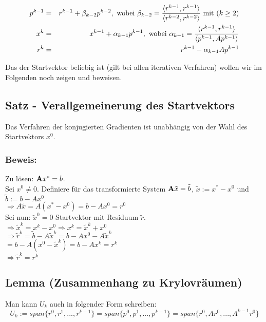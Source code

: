 \begin{eqnarray}
p^{k-1} &=& r^{k-1} + \beta_{k-2}p^{k-2}, \textnormal{ wobei } \beta_{k-2} = \frac {\langle r^{k-1}, r^{k-1} \rangle} {\langle r^{k-2}, r^{k-2} \rangle} \textnormal{ mit } (k \ge 2) \notag \\
x^{k} &=& x^{k-1} + \alpha_{k-1}p^{k-1}, \textnormal{ wobei } \alpha_{k-1} = \frac {\langle r^{k-1}, r^{k-1} \rangle} {\langle p^{k-1}, Ap^{k-1} \rangle} \notag \\
r^{k} &=& r^{k-1} - \alpha_{k-1}Ap^{k-1} \notag
\end{eqnarray}

Das der Startvektor beliebig ist (gilt bei allen iterativen Verfahren) wollen wir im Folgenden noch zeigen und beweisen.

\subsection{Satz - Verallgemeinerung des Startvektors}

Das Verfahren der konjugierten Gradienten ist unabhängig von der Wahl des Startvektors $x^{0}$.

\subsubsection{Beweis:}
Zu lösen: ${\textbf{A}}x^{*} = b$.
\\Sei $x^{0} \ne 0$. Definiere für das transformierte System ${\textbf{A}}\tilde x = \tilde b$, $\tilde x := x^{*} - x^{0}$ und $\tilde b := b - Ax^{0}$
\\$\Longrightarrow A\tilde x = A(x^{*} - x^{0}) = b - Ax^{0} = r^{0}$
\\Sei nun: $\tilde x^{0} = 0$ Startvektor mit Residuum $\tilde r$.
\\$\Longrightarrow \tilde x^{k} = x^{k} - x^{0} \Longrightarrow x^{k} = \tilde x^{k} + x^{0}$
\\$\Longrightarrow \tilde r^{k} = \tilde b - A\tilde x^{k} = b - Ax^{0} - A\tilde x^{k}$
\\$= b - A(x^{0} - \tilde x^{k}) = b - Ax^{k} = r^{k}$
\\$\Longrightarrow \tilde r^{k} = r^{k}$

\subsection{Lemma (Zusammenhang zu Krylovräumen)}
Man kann $U_{k}$ auch in folgender Form schreiben:
\begin{equation}
U_{k} := span\{r^{0}, r^{1},...,r^{k-1}\} = span\{p^{0},p^{1},...,p^{k-1}\} = span\{r^{0}, Ar^{0},...,A^{k-1}r^{0}\}
\end{equation}

